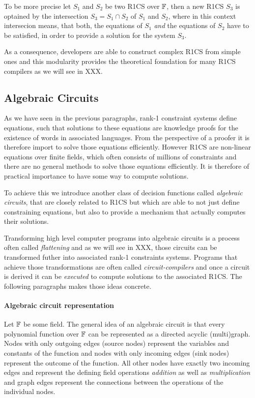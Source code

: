 To be more precise let $S_1$ and $S_2$ be two R1CS over $\mathbb{F}$, then a new R1CS $S_3$ is optained by the intersection $S_3 = S_1\cap S_2$  of $S_1$ and $S_2$, where in this context intersecion means, that both, the equations of $S_1$ \textit{and} the equations of $S_2$ have to be satisfied, in order to provide a solution for the system $S_3$.

As a consequence, developers are able to construct complex R1CS from simple ones and this modularity provides the theoretical foundation for many R1CS compilers as we will see in XXX.

\subsection{Algebraic Circuits} As we have seen in the previous paragraphs, rank-1 constraint systems define equations, such that solutions to these equations are knowledge proofs for the existence of words in associated languages. From the perspective of a proofer it is therefore import to solve those equations efficiently. However R1CS
are non-linear equations over finite fields, which often consists of millions of constraints and there are no general methods to solve those equations efficiently. It is therefore of practical importance to have some way to compute solutions.

To achieve this we introduce another class of decision functions called \textit{algebraic circuits}, that are closely related to R1CS but which are able to not just define constraining equations, but also to provide a mechanism that actually computes their solutions.

Transforming high level computer programs into algebraic circuits is a process often called \textit{flattening} and as we will see in XXX, those circuits can be transformed futher into associated rank-1 constraints systems. Programs that achieve those transformations are often called \textit{circuit-compilers} and once a circuit is derived it can be \textit{executed} to compute solutions to the associated R1CS. The following paragraphs makes those ideas concrete.

\paragraph{Algebraic circuit representation} Let $\mathbb{F}$ be some field.
The general idea of an algebraic circuit is that every polynomial function over $\mathbb{F}$ can be represented as a directed acyclic (multi)graph. Nodes with only outgoing edges (source nodes) represent the variables and constants of the function and nodes with only incoming edges (sink nodes) represent the outcome of the function. All other nodes have exactly two incoming edges and represent the defining field operations \textit{addition} as well as \textit{multiplication} and graph edges represent the connections between the operations of the individual nodes.

